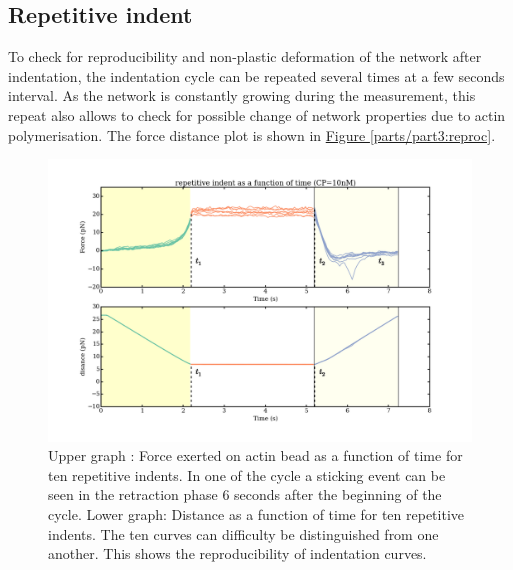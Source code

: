\documentclass[A4paperpaper,11pt,english]{sphinxmanual}
\begin{document}
\subsection{Repetitive indent}
\label{parts/part3:repetitive-indent}
To check for reproducibility and non-plastic deformation of the network after
indentation, the indentation cycle can be repeated several times at a few seconds
interval. As the network is constantly growing during the measurement, this
repeat also allows to check for possible change of network properties due to actin
polymerisation. The force distance plot is shown in \hyperref[parts/part3:reproc]{Figure  \ref*{parts/part3:reproc}}.
\begin{figure}[htbp]
\centering
\capstart

\includegraphics[width=1.000\linewidth]{reproc-time.png}
\caption{Upper graph : Force exerted on actin bead as a function of time for ten
repetitive indents. In one of the cycle a sticking event can be seen in the
retraction phase 6 seconds after the beginning of the cycle. Lower graph:
Distance as a function of time for  ten repetitive indents. The ten curves
can difficulty be distinguished from one another.  This shows the
reproducibility of indentation curves.}\label{parts/part3:reproc-time}\end{figure}
\end{document}
